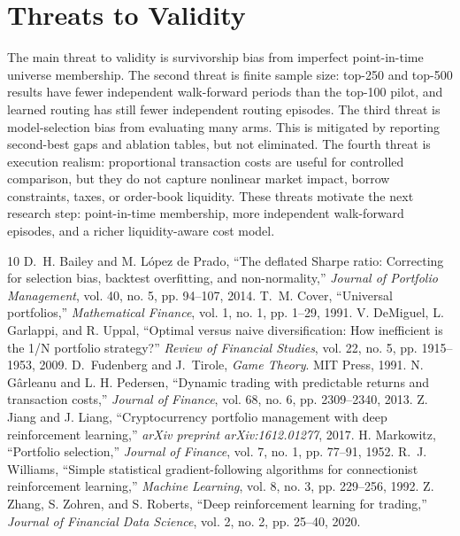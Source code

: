 \documentclass[journal,10pt]{IEEEtran}
\begin{document}
\section{Threats to Validity}
The main threat to validity is survivorship bias from imperfect point-in-time universe membership. The second threat is finite sample size: top-250 and top-500 results have fewer independent walk-forward periods than the top-100 pilot, and learned routing has still fewer independent routing episodes. The third threat is model-selection bias from evaluating many arms. This is mitigated by reporting second-best gaps and ablation tables, but not eliminated. The fourth threat is execution realism: proportional transaction costs are useful for controlled comparison, but they do not capture nonlinear market impact, borrow constraints, taxes, or order-book liquidity. These threats motivate the next research step: point-in-time membership, more independent walk-forward episodes, and a richer liquidity-aware cost model.


\begin{thebibliography}{10}
 D.~H. Bailey and M. L{\'o}pez de Prado, ``The deflated Sharpe ratio: Correcting for selection bias, backtest overfitting, and non-normality,'' \emph{Journal of Portfolio Management}, vol. 40, no. 5, pp. 94--107, 2014.
 T.~M. Cover, ``Universal portfolios,'' \emph{Mathematical Finance}, vol. 1, no. 1, pp. 1--29, 1991.
 V. DeMiguel, L. Garlappi, and R. Uppal, ``Optimal versus naive diversification: How inefficient is the 1/N portfolio strategy?'' \emph{Review of Financial Studies}, vol. 22, no. 5, pp. 1915--1953, 2009.
 D.~Fudenberg and J.~Tirole, \emph{Game Theory}. MIT Press, 1991.
 N. G{\^a}rleanu and L. H. Pedersen, ``Dynamic trading with predictable returns and transaction costs,'' \emph{Journal of Finance}, vol. 68, no. 6, pp. 2309--2340, 2013.
 Z. Jiang and J. Liang, ``Cryptocurrency portfolio management with deep reinforcement learning,'' \emph{arXiv preprint arXiv:1612.01277}, 2017.
 H. Markowitz, ``Portfolio selection,'' \emph{Journal of Finance}, vol. 7, no. 1, pp. 77--91, 1952.
 R.~J. Williams, ``Simple statistical gradient-following algorithms for connectionist reinforcement learning,'' \emph{Machine Learning}, vol. 8, no. 3, pp. 229--256, 1992.
 Z. Zhang, S. Zohren, and S. Roberts, ``Deep reinforcement learning for trading,'' \emph{Journal of Financial Data Science}, vol. 2, no. 2, pp. 25--40, 2020.
\end{thebibliography}
\end{document}
